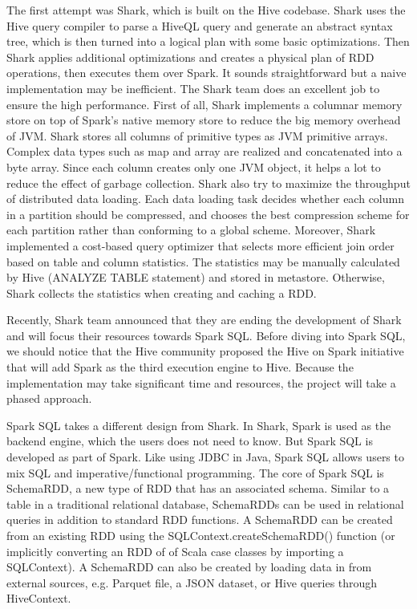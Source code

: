\documentclass[11pt]{book}
\begin{document}
The first attempt was Shark, which is built on the Hive codebase. Shark uses the Hive query compiler to parse a HiveQL query and generate an abstract syntax tree, which is then turned into a logical plan with some basic optimizations. Then Shark applies additional optimizations and creates a physical plan of RDD operations, then executes them over Spark. It sounds straightforward but a naive implementation may be inefficient. The Shark team does an excellent job to ensure the high performance. First of all, Shark implements a columnar memory store on top of Spark's native memory store to reduce the big memory overhead of JVM. Shark stores all columns of primitive types as JVM primitive arrays. Complex data types such as map and array are realized and concatenated into a byte array. Since each column creates only one JVM object, it helps a lot to reduce the effect of garbage collection. Shark also try to maximize the throughput of distributed data loading. Each data loading task decides whether each column in a partition should be compressed, and chooses the best compression scheme for each partition rather than conforming to a global scheme. Moreover, Shark implemented a cost-based query optimizer that selects more efficient join order based on table and column statistics. The statistics may be manually calculated by Hive (ANALYZE TABLE statement) and stored in metastore. Otherwise, Shark collects the statistics when creating and caching a RDD.

Recently, Shark team announced that they are ending the development of Shark and will focus their resources towards Spark SQL. Before diving into Spark SQL, we should notice that the Hive community proposed the Hive on Spark initiative that will add Spark as the third execution engine to Hive. Because the implementation may take significant time and resources, the project will take a phased approach.

Spark SQL takes a different design from Shark. In Shark, Spark is used as the backend engine, which the users does not need to know. But Spark SQL is developed as part of Spark. Like using JDBC in Java, Spark SQL allows users to mix SQL and imperative/functional programming. The core of Spark SQL is SchemaRDD, a new type of RDD that has an associated schema. Similar to a table in a traditional relational database, SchemaRDDs can be used in relational queries in addition to standard RDD functions. A SchemaRDD can be created from an existing RDD using the SQLContext.createSchemaRDD() function (or implicitly converting an RDD of of Scala case classes by importing a SQLContext). A SchemaRDD can also be created by loading data in from external sources, e.g. Parquet file, a JSON dataset, or Hive queries through HiveContext.
\end{document}
